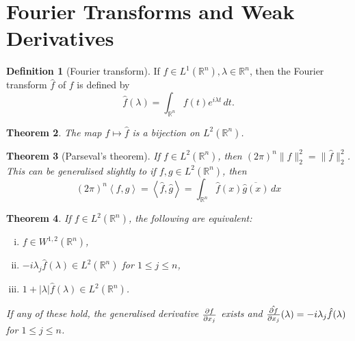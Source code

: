 \documentclass[10pt, oneside, reqno]{amsart}
\theoremstyle{plain}%
\newtheorem{thm}{Theorem}[section]
\numberwithin{equation}{section}
\theoremstyle{definition}
\newtheorem{defn}[thm]{Definition}
\theoremstyle{remark}
\newcommand{\R}{\mathbb{R}}
\newcommand{\iprod}[1]{\left\langle #1 \right\rangle}
\begin{document}
\section{Fourier Transforms and Weak Derivatives} %
\label{sec:fourier_transforms_and_weak_derivatives}

\begin{defn}[Fourier transform]
    If $f \in L^1(\R^n), \lambda \in \R^n$, then the Fourier transform $\hat f$ of $f$ is defined by \begin{equation}
        \hat f(\lambda) = \int_{\R^n} f(t) e^{i \lambda t} \, dt.
    \end{equation}
\end{defn}

\begin{thm}
    The map $f \mapsto \hat f$ is a bijection on $L^2(\R^n)$. 
\end{thm}

\begin{thm}[Parseval's theorem]
    If $f \in L^2(\R^n)$, then $(2 \pi)^n \| f \|_2^2 = \| \hat f \|_2^2$.  This can be generalised slightly to if $f, g \in L^2(\R^n)$, then \[
        (2 \pi)^n \iprod{f, g} = \iprod{\hat f, \hat g} = \int_{\R^n} \hat f(x) \overline{\hat g(x)} \, dx
    \]
\end{thm}

\begin{thm}
    \label{thm:his_thm_4.1}
    If $f \in L^2(\R^n)$, the following are equivalent:
    \begin{enumerate}[(i)]
        \item $f \in W^{1, 2}(\R^n)$,
        \item $-i \lambda_j \hat f(\lambda) \in L^2(\R^n)$ for $1 \leq j \leq n$, 
        \item $1 + |\lambda| \hat f(\lambda) \in L^2(\R^n)$.  
    \end{enumerate}
    
    If any of these hold, the generalised derivative $\frac{\partial f}{\partial x_j}$ exists and $\hat{ \frac{\partial f}{\partial x_j}}(\lambda) = -i \lambda_j \hat f (\lambda)$ for $1 \leq j \leq n$.
\end{thm}
\end{document}

